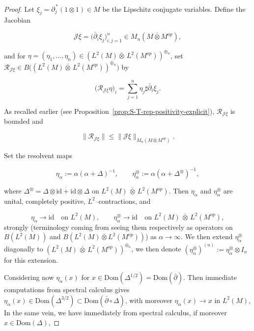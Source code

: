 \documentclass[10pt,a4paper,reqno]{amsart}
\newcommand{\Dom}{\mathrm{Dom}}
\begin{document}
\begin{proof}
Let $\xi_j=\partial_j^{\,*}(1\otimes 1)\in M$ be the Lipschitz conjugate variables.  
Define the Jacobian


\[
\mathscr{J}\xi=\big(\bar\partial_i\xi_j\big)_{i,j=1}^n\in M_n(M\bar\otimes M^{op}),
\]


and for $\eta=(\eta_1,\ldots,\eta_n)\in (L^2(M){\bar\otimes}\,L^2(M^{op}))^{\oplus_n}$, set
$\mathcal{R}_{\mathscr{J}\xi}\in B\big((L^2(M){\bar\otimes}\,L^2(M^{op}))^{\oplus_n}\big)$ by


\[
\big(\mathcal{R}_{\mathscr{J}\xi}\eta\big)_i=\sum_{j=1}^n \eta_j \sharp \bar\partial_i\xi_j.
\]


As recalled earlier (see Proposition~\ref{prop:S-T-rep-positivity-explicit}), $\mathcal{R}_{\mathscr{J}\xi}$ is bounded and


\[
\|\mathcal{R}_{\mathscr{J}\xi}\|\le \|\mathscr{J}\xi\|_{M_n(M\bar\otimes M^{op})}.
\]



\smallskip

Set the resolvent maps


\[
\eta_\alpha := \alpha(\alpha+\Delta)^{-1},
\qquad
{\eta}_\alpha^{\otimes} := \alpha(\alpha+\Delta^{\otimes})^{-1},
\]


where $\Delta^{\otimes}=\overline{\Delta\otimes\mathrm{id}+\mathrm{id}\otimes\Delta}$ on
$L^2(M)\,\bar\otimes\,L^2(M^{op})$. Then $\eta_\alpha$ and $\eta_\alpha^{\otimes}$ are unital, completely
positive, $L^2$–contractions, and


\[
\eta_\alpha\to\mathrm{id}\quad\text{on }L^2(M),
\qquad
\eta_\alpha^{\otimes}\to\mathrm{id}\quad\text{on }L^2(M)\,\bar\otimes\,L^2(M^{op}),
\]
strongly (terminology coming from seeing them respectively as operators on $B(L^2(M))$ and $B(L^2(M)\bar\otimes L^2(M^{op}))$) as $\alpha\to\infty$.
\bigbreak
We then extend $\eta_\alpha^{\otimes}$ diagonally to 
$(L^2(M)\,\bar\otimes\,L^2(M^{op}))^{\oplus_n}$, we then denote
$(\eta_\alpha^{\otimes})^{(n)}:=\eta_\alpha^{\otimes}\otimes I_n$ for this extension.






\bigbreak
Considering now $\eta_\alpha (x)$ for $x\in \Dom(\Delta^{1/2})=\Dom(\bar\partial)$.
Then immediate computations from spectral calculus gives $\eta_\alpha(x)\in \Dom(\Delta^{3/2})\subset \Dom(\bar\partial\circ\Delta)$, with moreover $\eta_\alpha(x)\to x$ in $L^2(M)$,
\bigbreak
In the same vein, we have immediately from spectral calculus, if moreover $x\in \Dom(\Delta)$,



\end{proof}
\end{document}
